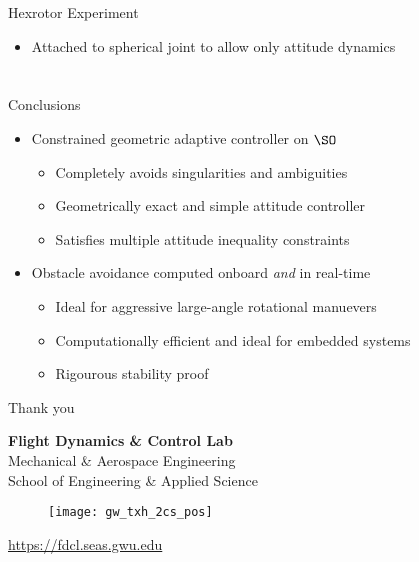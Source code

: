 \documentclass[11pt,professionalfonts]{beamer}
\newcommand{\vs}{\vspace{0.3cm}}
\begin{document}
\begin{frame}{Hexrotor Experiment} %
\begin{itemize}
	\item Attached to spherical joint to allow only attitude dynamics
\end{itemize}
\begin{figure}
\centering
{} 
\end{figure}
\end{frame}   %

\section*{}
\subsection*{}

\begin{frame}{Conclusions} %

	\begin{itemize}
		\item Constrained geometric adaptive controller on \( \SO \)
		\begin{itemize}
			\item Completely avoids singularities and ambiguities 
			\item Geometrically exact and simple attitude controller
			\item Satisfies multiple attitude inequality constraints 
		\end{itemize}
		\pause
		\vs
		\item Obstacle avoidance computed onboard \emph{and} in real-time
		\begin{itemize}
			\item Ideal for aggressive large-angle rotational manuevers
			\item Computationally efficient and ideal for embedded systems 
			\item Rigourous stability proof 
		\end{itemize}
	\end{itemize}

\end{frame}   %

\begin{frame}[c]{Thank you}
	\centering
	
	\textbf{\large Flight Dynamics \& Control Lab} \\
	Mechanical \& Aerospace Engineering \\
	School of Engineering \& Applied Science
	
	\begin{figure} %
       	\texttt{[image: gw\_txh\_2cs\_pos]}
  	\end{figure}
	
	\url{https://fdcl.seas.gwu.edu}
\end{frame}
\end{document}
